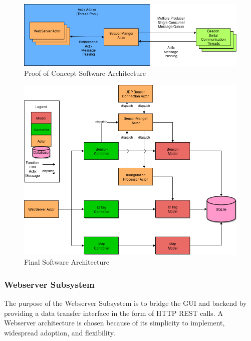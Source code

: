 \begin{figure}[H]
	\centering
    \includegraphics[scale=0.6]{images/poc_arch.png}
    \caption{Proof of Concept Software Architecture}
    \label{software_poc_arch}
\end{figure}

\begin{figure}[H]
	\centering
    \includegraphics[scale=0.6]{images/prototype_software_arch.png}
    \caption{Final Software Architecture}
    \label{software_final_arch}
\end{figure}

\bigskip
\subsubsection{Webserver Subsystem}
The purpose of the Webserver Subsystem is to bridge the GUI and backend by providing a data transfer interface in the form of HTTP REST calls.
A Webserver architecture is chosen because of its simplicity to implement, widespread adoption, and flexibility.

